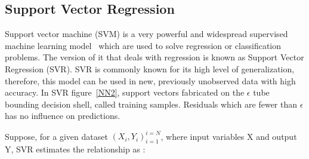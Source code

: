 \subsection{Support Vector Regression}
\label{SVR}

Support vector machine (SVM) is a very powerful and widespread supervised machine learning model~\cite{friedman2001elements} which are used to solve regression or classification problems. The version of it that deals with regression is known as Support Vector Regression (SVR). SVR is commonly known for its high level of generalization, therefore, this model can be used in new, previously unobserved data with high accuracy. In SVR figure~\ref{NN2}, support vectors fabricated on the $\epsilon$ tube bounding decision shell, called training samples. Residuals which are fewer than $\epsilon$ has no influence on predictions.

\begin{figure}
\centering
{}
\end{figure}


Suppose, for a given dataset ${(X_i, Y_i)}^{i=N} _{i=1}$, where input variables X and output Y, SVR estimates the relationship as : 

